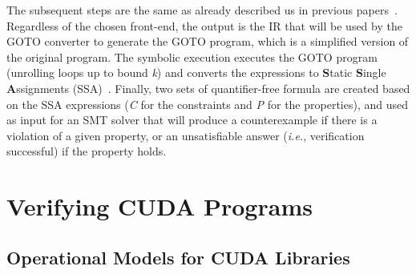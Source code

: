 \documentclass[times, doublespace]{cpeauth}
\begin{document}
The subsequent steps are the same as already described us in previous
papers~\cite{cordeiro:2012}. Regardless of the chosen front-end, the output is the
IR that will be used by the GOTO converter to generate the GOTO program, which
is a simplified version of the original program. The symbolic execution executes
the GOTO program (unrolling loops up to bound \emph{k}) and converts the
expressions to \textbf{S}tatic \textbf{S}ingle \textbf{A}ssignments (SSA)~\cite{cytron89}. Finally, two
sets of quantifier-free formula are created based on the SSA expressions
(\textit{C} for the constraints and \textit{P} for the properties), and used as
input for an SMT solver that will produce a counterexample if there is a
violation of a given property, or an unsatisfiable answer (\textit{i.e.}, verification
successful) if the property holds.

\vspace{-6pt}
\section{Verifying CUDA Programs}
\label{sec:methodology}
\vspace{-2pt}
\label{sec:metodologiaProposta}

\subsection{Operational Models for CUDA Libraries}
\vspace{-2pt}
\label{sec:modeloOperacional}
\end{document}
